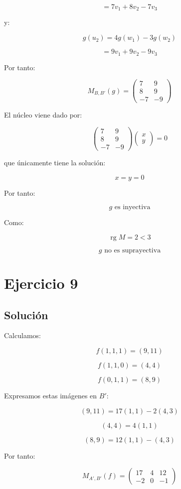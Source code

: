 \documentclass[11pt,a4paper]{article}
\newcommand{\rg}{\operatorname{rg}}
\begin{document}
	\[
	=
	7v_1+8v_2-7v_3
	\]

	y:

	\[
	g(u_2)
	=
	4g(w_1)-3g(w_2)
	\]

	\[
	=
	9v_1+9v_2-9v_3
	\]

	Por tanto:

	\[
	\boxed{
	M_{B,B'}(g)
	=
	\begin{pmatrix}
	7&9\\
	8&9\\
	-7&-9
	\end{pmatrix}
	}
	\]

	El núcleo viene dado por:

	\[
	\begin{pmatrix}
	7&9\\
	8&9\\
	-7&-9
	\end{pmatrix}
	\begin{pmatrix}
	x\\y
	\end{pmatrix}
	=
	0
	\]

	que únicamente tiene la solución:

	\[
	x=y=0
	\]

	Por tanto:

	\[
	\boxed{
	g\text{ es inyectiva}
	}
	\]

	Como:

	\[
	\rg M=2<3
	\]

	\[
	\boxed{
	g\text{ no es suprayectiva}
	}
	\]

\section{Ejercicio 9}
	\subsection{Solución}

	Calculamos:

	\[
	f(1,1,1)=(9,11)
	\]

	\[
	f(1,1,0)=(4,4)
	\]

	\[
	f(0,1,1)=(8,9)
	\]

	Expresamos estas imágenes en $B'$:

	\[
	(9,11)
	=
	17(1,1)-2(4,3)
	\]

	\[
	(4,4)
	=
	4(1,1)
	\]

	\[
	(8,9)
	=
	12(1,1)-(4,3)
	\]

	Por tanto:

	\[
	\boxed{
	M_{A',B'}(f)
	=
	\begin{pmatrix}
	17&4&12\\
	-2&0&-1
	\end{pmatrix}
	}
	\]
\end{document}
